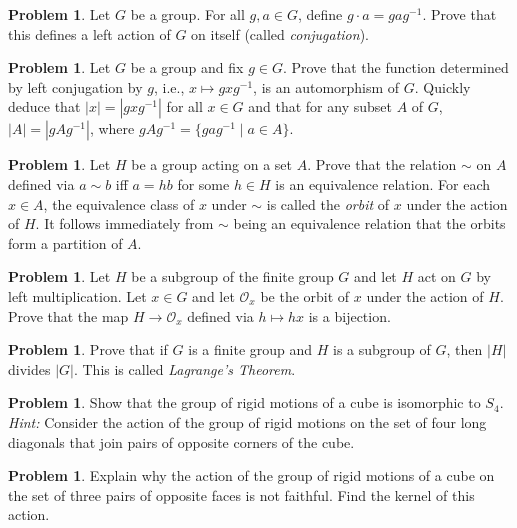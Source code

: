 \documentclass[11pt]{scrartcl}
\theoremstyle{definition}
\newtheorem{problem}[theorem]{Problem}
\begin{document}
\begin{problem}
Let $G$ be a group.  For all $g,a\in G$, define $g\cdot a = gag^{-1}$. Prove that this defines a left action of $G$ on itself (called \emph{conjugation}).
\end{problem}

\begin{problem}
Let $G$ be a group and fix $g\in G$. Prove that the function determined by left conjugation by $g$, i.e., $x\mapsto gxg^{-1}$, is an automorphism of $G$. Quickly deduce that $|x|=|gxg^{-1}|$ for all $x\in G$ and that for any subset $A$ of $G$, $|A|=|gAg^{-1}|$, where $gAg^{-1}=\{gag^{-1}\mid a\in A\}$.
\end{problem}

\begin{problem}
Let $H$ be a group acting on a set $A$. Prove that the relation $\sim$ on $A$ defined via $a\sim b$ iff $a=hb$ for some $h\in H$ is an equivalence relation. For each $x\in A$, the equivalence class of $x$ under $\sim$ is called the \emph{orbit} of $x$ under the action of $H$. It follows immediately from $\sim$ being an equivalence relation that the orbits form a partition of $A$.
\end{problem}

\begin{problem}
Let $H$ be a subgroup of the finite group $G$ and let $H$ act on $G$ by left multiplication. Let $x\in G$ and let $\mathcal{O}_x$ be the orbit of $x$ under the action of $H$. Prove that the map $H\to \mathcal{O}_x$ defined via $h\mapsto hx$ is a bijection.
\end{problem}

\begin{problem}
Prove that if $G$ is a finite group and $H$ is a subgroup of $G$, then $|H|$ divides $|G|$.  This is called \emph{Lagrange's Theorem}.
\end{problem}

\begin{problem}
Show that the group of rigid motions of a cube is isomorphic to $S_4$. \emph{Hint:} Consider the action of the group of rigid motions on the set of four long diagonals that join pairs of opposite corners of the cube.
\end{problem}

\begin{problem}
Explain why the action of the group of rigid motions of a cube on the set of three pairs of opposite faces is not faithful. Find the kernel of this action.
\end{problem}
\end{document}
